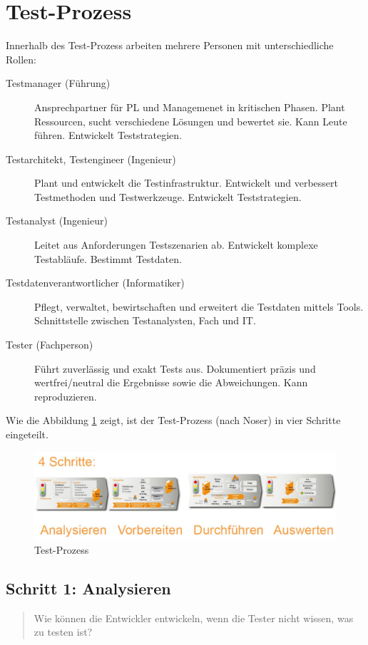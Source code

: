 \section{Test-Prozess}

Innerhalb des Test-Prozess arbeiten mehrere Personen mit unterschiedliche Rollen:

\begin{description}
	\item[Testmanager (Führung)] Ansprechpartner für PL und Managemenet in kritischen Phasen. Plant Ressourcen, sucht verschiedene Lösungen und bewertet sie. Kann Leute führen. Entwickelt Teststrategien.
	\item[Testarchitekt, Testengineer (Ingenieur)] Plant und entwickelt die Testinfrastruktur. Entwickelt und verbessert Testmethoden und Testwerkzeuge. Entwickelt Teststrategien.
	\item[Testanalyst (Ingenieur)] Leitet aus Anforderungen Testszenarien ab. Entwickelt komplexe Testabläufe. Bestimmt Testdaten.
	\item[Testdatenverantwortlicher (Informatiker)] Pflegt, verwaltet, bewirtschaften und erweitert die Testdaten mittels Tools. Schnittstelle zwischen Testanalysten, Fach und IT. 
	\item[Tester (Fachperson)] Führt zuverlässig und exakt Tests aus. Dokumentiert präzis und wertfrei/neutral die Ergebnisse sowie die Abweichungen. Kann reproduzieren.
\end{description}

Wie die Abbildung \ref{fig:test-prozess} zeigt, ist der Test-Prozess (nach Noser) in vier Schritte eingeteilt.

\begin{figure}[h!]
\centering
\includegraphics[width=0.7\linewidth]{fig/test-prozess}
\caption{Test-Prozess}
\label{fig:test-prozess}
\end{figure}

\subsection{Schritt 1: Analysieren}

\begin{quote}
	Wie können die Entwickler entwickeln, wenn die Tester nicht wissen, was zu testen ist?
\end{quote}


